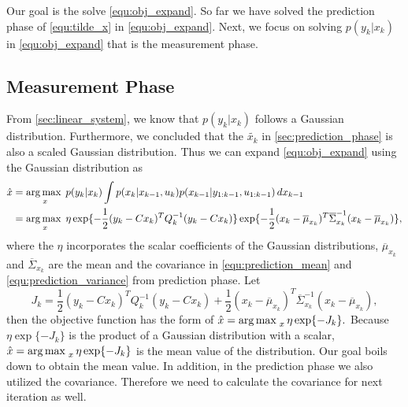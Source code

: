 Our goal is the solve \cref{equ:obj_expand}. So far we have solved the prediction phase of \cref{equ:tilde_x} in \cref{equ:obj_expand}. Next, we focus on solving $p(y_k|x_k)$ in \cref{equ:obj_expand} that is the measurement phase. 

\subsection{Measurement Phase}
\label{sec:solving_opt_problem}

From \cref{sec:linear_system}, we know that $p(y_k|x_k)$ follows a Gaussian distribution. Furthermore, we concluded that the $\tilde{x_k}$ in \cref{sec:prediction_phase} is also a scaled Gaussian distribution. Thus we can expand \cref{equ:obj_expand} using the Gaussian distribution as 
\begin{equation}
	\begin{split}
	\hat{x} &= \operatorname*{arg\,max\;}_{x} p(y_k|x_k)\int p(x_k|x_{k-1},u_{k})p(x_{k-1}|y_{1:k-1},u_{1:k-1}) \,dx_{k-1}\\
	&=\operatorname*{arg\,max\;}_{x} \eta \exp \{ {-\frac{1}{2} (y_k-Cx_k)^T Q_k^{-1} (y_k-Cx_k)} \} \exp \{{-\frac{1}{2} (x_k-\overline{\mu}_{x_k})^T \overline{\Sigma}_{x_k}^{-1} (x_k-\overline{\mu}_{x_k})} \},
	\end{split} 
\end{equation}
where the $\eta$ incorporates the scalar coefficients of the Gaussian distributions, $\overline{\mu}_{x_k}$ and $\overline{\Sigma}_{x_k}$ are the mean and the covariance in \cref{equ:prediction_mean} and \cref{equ:prediction_variance} from prediction phase. 
Let 
\begin{equation} \label{equ:cost_function_jk}
	J_k=\frac{1}{2} (y_k-Cx_k)^T Q_k^{-1} (y_k-Cx_k) + \frac{1}{2} (x_k-\overline{\mu}_{x_k})^T \overline{\Sigma}_{x_k}^{-1} (x_k-\overline{\mu}_{x_k}),
\end{equation}
then the objective function has the form of
$ \label{equ:incoporated_Jk}
	\hat{x} = \operatorname*{arg\,max\;}_{x} \eta \exp \{ -J_k \}.
$
Because $\eta \exp \{ -J_k \}$ is the product of a Gaussian distribution with a scalar, $\hat{x} = \operatorname*{arg\,max\;}_{x} \eta \exp \{ -J_k \}$ is the mean value of the distribution. Our goal boils down to obtain the mean value. In addition, in the prediction phase we also utilized the covariance. Therefore we need to calculate the covariance for next iteration as well. 

